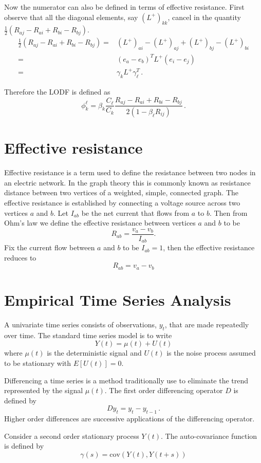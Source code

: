 \documentclass{article}
\renewcommand{\t}{\text}
\begin{document}
Now the numerator can also be defined in terms of effective resistance. First observe that all the diagonal elements, say $(L^+)_{kk}$, cancel in the quantity $\frac{1}{2}(R_{aj}-R_{ai}+R_{bi}-R_{bj})$.  
\[\begin{aligned}
\frac{1}{2}(R_{aj}-R_{ai}+R_{bi}-R_{bj}) =& (L^+)_{ai}-(L^+)_{aj}+(L^+)_{bj}-(L^+)_{bi}\\
=& (e_a-e_b)^TL^+(e_i-e_j)\\
=& \gamma_kL^+\gamma_\ell^T\,.
\end{aligned}\]

Therefore the LODF is defined as
\[\phi_k^{\ell} = \beta_k \frac{C_\ell}{C_k} \frac{R_{aj}-R_{ai}+R_{bi}-R_{bj}}{2(1-\beta_\ell R_{ij})}\,.\]



\section{Effective resistance}
Effective resistance is a term used to define the resistance between two nodes in an electric network. In the graph theory this is commonly known as resistance distance between two vertices of a weighted, simple, connected graph. The effective resistance is established by connecting a voltage source across two vertices $a$ and $b$. Let $I_{ab}$ be the net current that flows from $a$ to $b$. Then from Ohm's law we define the effective resistance between vertices $a$ and $b$ to be
\[R_{ab} = \frac{v_a-v_b}{I_{ab}}.\] 
Fix the current flow between $a$ and $b$ to be $I_{ab}=1$, then the effective resistance reduces to 
\[R_{ab} =v_a-v_b\]

\section{Empirical Time Series Analysis}
A univariate time series consists of observations, $y_t$, that are made repeatedly over time. The standard time series model is to write 
\[Y(t) = \mu(t) + U(t)\]
where $\mu(t)$ is the deterministic signal and $U(t)$ is the noise process assumed to be stationary with $E[U(t)]=0$. 

Differencing a time series is a method traditionally use to eliminate the trend represented by the signal $\mu(t)$. The first order differencing operator $D$ is defined by
\[Dy_t = y_t-y_{t-1}\,. \]
Higher order differences are successive applications of the differencing operator. 

Consider a second order stationary process $Y(t)$. The auto-covariance function is defined by 
\[\gamma(s) = \t{cov}(Y(t), Y(t+s))\]
\end{document}
